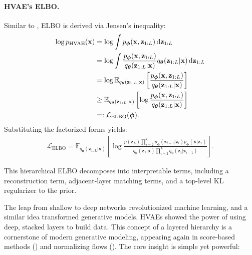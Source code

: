 \paragraph{HVAE's ELBO.}
Similar to , ELBO is derived via Jensen's inequality:
\begin{align}\label{eq:hvae-elbo}
\begin{aligned}
    \log p_{\text{HVAE}}(\mathbf{x}) 
&= \log \int p_{\bm{\phi}}(\mathbf{x}, \mathbf{z}_{1:L}) \mathop{}\!\mathrm{d} \mathbf{z}_{1:L} \\
&= \log \int \frac{p_{\bm{\phi}}(\mathbf{x}, \mathbf{z}_{1:L})}{q_{\bm{\theta}}(\mathbf{z}_{1:L}|\mathbf{x})}   q_{\bm{\theta}}(\mathbf{z}_{1:L}|\mathbf{x}) \mathop{}\!\mathrm{d} \mathbf{z}_{1:L} \\
&= \log \mathbb{E}_{q_{\bm{\theta}}(\mathbf{z}_{1:L}|\mathbf{x})} \left[ \frac{p_{\bm{\phi}}(\mathbf{x}, \mathbf{z}_{1:L})}{q_{\bm{\theta}}(\mathbf{z}_{1:L}|\mathbf{x})} \right] \\
&\geq \mathbb{E}_{q_{\bm{\theta}}(\mathbf{z}_{1:L}|\mathbf{x})} \left[ \log \frac{p_{\bm{\phi}}(\mathbf{x}, \mathbf{z}_{1:L})}{q_{\bm{\theta}}(\mathbf{z}_{1:L}|\mathbf{x})} \right]\\
&=:\mathcal{L}_{\text{ELBO}}(\bm{\phi}).
\end{aligned}
\end{align}
Substituting the factorized forms yields:
\begin{align*}
\mathcal{L}_{\text{ELBO}} 
= \mathbb{E}_{q_{\bm{\theta}}(\mathbf{z}_{1:L}|\mathbf{x})} \left[ 
\log \frac{
p(\mathbf{z}_L) \prod_{i=2}^{L} p_{\bm{\phi}}(\mathbf{z}_{i-1} | \mathbf{z}_i)   p_{\bm{\phi}}(\mathbf{x} | \mathbf{z}_1)
}{
q_{\bm{\theta}}(\mathbf{z}_1|\mathbf{x}) \prod_{i=2}^{L} q_{\bm{\theta}}(\mathbf{z}_i|\mathbf{z}_{i-1})
}
\right].
\end{align*}

This hierarchical ELBO decomposes into interpretable terms, including a
reconstruction term, adjacent-layer matching terms, and a top-level KL
regularizer to the prior.

The leap from shallow to deep networks revolutionized machine learning, and a similar idea transformed generative models. HVAEs showed the power of using deep, stacked layers to build data. This concept of a layered hierarchy is a cornerstone of modern generative modeling, appearing again in score-based methods () and normalizing flows (). The core insight is simple yet powerful: 

